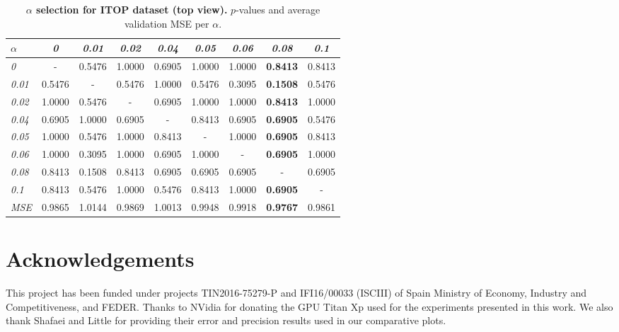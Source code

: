 \documentclass[review,12pt,3p]{elsarticle}
\begin{document}
\begin{table}[t]
\caption{\textbf{$\alpha$ selection for ITOP dataset (top view).} $p$-values and average validation MSE per $\alpha$.}
\label{tab:statsAL1iTOPtview}
\scriptsize %
\begin{center}
\setlength{\tabcolsep}{0.2em} %
\begin{tabular}{|l|c c c c c c c c |}
\hline
 $\alpha$ &\emph{0}& \emph{0.01} & \emph{0.02}& \emph{0.04}& \emph{0.05}& \emph{0.06}& \emph{0.08}& \emph{0.1}\\
  \hline \emph{0} & - & 0.5476 & 1.0000 & 0.6905 & 1.0000 & 1.0000 & \textbf{0.8413} & 0.8413  \\
  \hline \emph{0.01} & 0.5476 & - & 0.5476 & 1.0000 & 0.5476 & 0.3095 & \textbf{0.1508} & 0.5476  \\
  \hline \emph{0.02} & 1.0000 & 0.5476 & - & 0.6905 & 1.0000 & 1.0000 & \textbf{0.8413} & 1.0000  \\
  \hline \emph{0.04} & 0.6905 & 1.0000 & 0.6905 & - & 0.8413 & 0.6905 & \textbf{0.6905} & 0.5476  \\
  \hline \emph{0.05} & 1.0000 & 0.5476 & 1.0000 & 0.8413 & - & 1.0000 & \textbf{0.6905} & 0.8413  \\
  \hline \emph{0.06} & 1.0000 & 0.3095 & 1.0000 & 0.6905 & 1.0000 & - & \textbf{0.6905} & 1.0000  \\
  \hline \emph{0.08} & 0.8413 & 0.1508 & 0.8413 & 0.6905 & 0.6905 & 0.6905 & - & 0.6905  \\
  \hline \emph{0.1} & 0.8413 & 0.5476 & 1.0000 & 0.5476 & 0.8413 & 1.0000 & \textbf{0.6905} & -  \\
\hline 
\hline
\textit{MSE} & 0.9865  &  1.0144    &0.9869  &  1.0013  &  0.9948 &   0.9918&    \textbf{0.9767}&    0.9861\\
\hline
\end{tabular} 
\end{center}
\end{table}



\section*{Acknowledgements}
This project has been funded under projects TIN2016-75279-P and IFI16/00033 (ISCIII) of Spain Ministry of Economy, Industry and Competitiveness, and FEDER.
Thanks to NVidia for donating the GPU Titan Xp used for the experiments presented in this work.
We also thank Shafaei and Little for providing their error and precision results used in our comparative plots.
\end{document}
